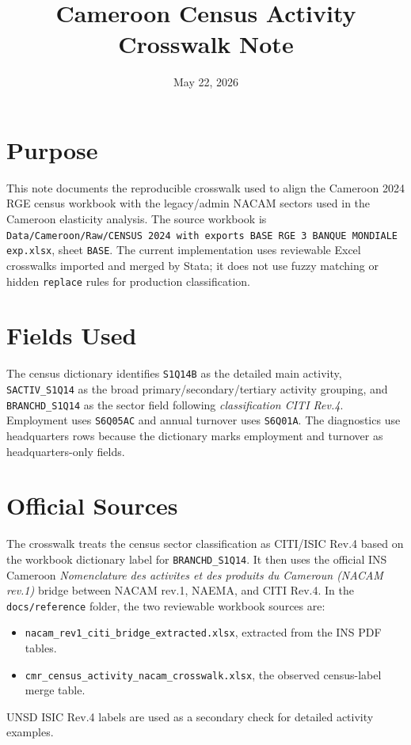 \documentclass[11pt]{article}
\title{Cameroon Census Activity Crosswalk Note}
\author{}
\date{May 22, 2026}
\begin{document}
\maketitle

\section*{Purpose}

This note documents the reproducible crosswalk used to align the Cameroon 2024 RGE census workbook with the legacy/admin NACAM sectors used in the Cameroon elasticity analysis. The source workbook is \texttt{Data/Cameroon/Raw/CENSUS 2024 with exports BASE RGE 3 BANQUE MONDIALE exp.xlsx}, sheet \texttt{BASE}. The current implementation uses reviewable Excel crosswalks imported and merged by Stata; it does not use fuzzy matching or hidden \texttt{replace} rules for production classification.

\section*{Fields Used}

The census dictionary identifies \texttt{S1Q14B} as the detailed main activity, \texttt{SACTIV\_S1Q14} as the broad primary/secondary/tertiary activity grouping, and \texttt{BRANCHD\_S1Q14} as the sector field following \emph{classification CITI Rev.4}. Employment uses \texttt{S6Q05AC} and annual turnover uses \texttt{S6Q01A}. The diagnostics use headquarters rows because the dictionary marks employment and turnover as headquarters-only fields.

\section*{Official Sources}

The crosswalk treats the census sector classification as CITI/ISIC Rev.4 based on the workbook dictionary label for \texttt{BRANCHD\_S1Q14}. It then uses the official INS Cameroon \emph{Nomenclature des activites et des produits du Cameroun (NACAM rev.1)} bridge between NACAM rev.1, NAEMA, and CITI Rev.4. In the \texttt{docs/reference} folder, the two reviewable workbook sources are:
\begin{itemize}
    \item \texttt{nacam\_rev1\_citi\_bridge\_extracted.xlsx}, extracted from the INS PDF tables.
    \item \texttt{cmr\_census\_activity\_nacam\_crosswalk.xlsx}, the observed census-label merge table.
\end{itemize}
UNSD ISIC Rev.4 labels are used as a secondary check for detailed activity examples.
\end{document}

